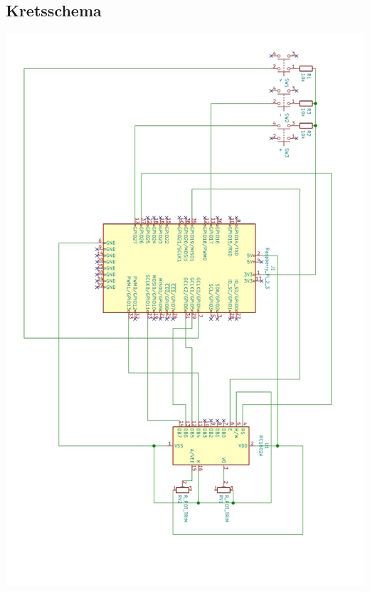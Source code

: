\documentclass[12pt, a4paper,titlepage]{article}
\begin{document}
        \subsection{Kretsschema}
        \label{sec:krets}
            \includegraphics[scale=0.4]{krets.png}
\end{document}
